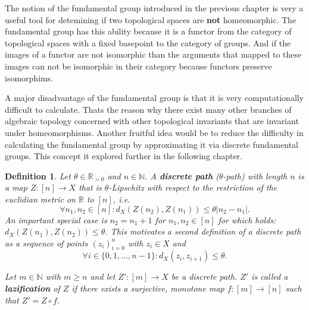 \documentclass[a4paper, 11pt, twoside]{article}
\newcommand{\R}[0]{\mathbb{R}}
\newcommand{\N}[0]{\mathbb{N}}
\theoremstyle{break}
\theoremstyle{break}
\newtheorem{defin}[thm]{Definition}
\begin{document}
The notion of the fundamental group introduced in the previous chapter is very a useful tool for detemining if two topological spaces are \textbf{not} homeomorphic.
The fundamental group has this ability because it is a functor from the category of topological spaces with a fixed basepoint to the category of groups. 
And if the images of a functor are not isomorphic than the arguments that mapped to these images can not be isomorphic in their category because functors preserve isomorphims.

A major disadvantage of the fundamental group is that it is very computationally difficult to calculate.
Thats the reason why there exist many other branches of algebraic topology concerned with other topological invariants that are invariant under homeomorphisms. 
Another fruitful idea would be to reduce the difficulty in calculating the fundamental group by approximating it via discrete fundamental groups. 
This concept it explored further in the following chapter.

\begin{defin} \label{def:discrete-path}
  Let $\theta \in \R_{>0}$ and $n \in \N$. A \textbf{discrete path} ($\theta$-path) with length $n$ is a map $Z: [n] \to X$ that is $\theta$-Lipschitz with respect to the restriction of the euclidian metric on $\R$ to $[n]$, i.e.
  \begin{equation}
    \forall n_1, n_2 \in [n]\colon d_X(Z(n_2), Z(n_1)) \leq \theta |n_2 - n_1|.
  \end{equation}
  An important special case is $n_2 = n_1 + 1$ for $n_1, n_2 \in [n]$ for which holds: $d_X(Z(n_1), Z(n_2)) \leq \theta$. This motivates a second
  definition of a discrete path as a sequence of points $(z_i)_{i=0}^n$ with $z_i \in X$ and
  \begin{equation}
    \forall i \in \{0, 1, \ldots, n-1\} \colon d_X(z_i, z_{i+1}) \leq \theta.
  \end{equation}

  Let $m \in \N$ with $m \geq n$ and let $Z': [m] \to X$ be a discrete path. $Z'$ is called a \textbf{lazification} of $Z$ if there exists a surjective, monotone map 
  $f: [m] \to [n]$ such that $Z' = Z \circ f$.
\end{defin}
\end{document}
